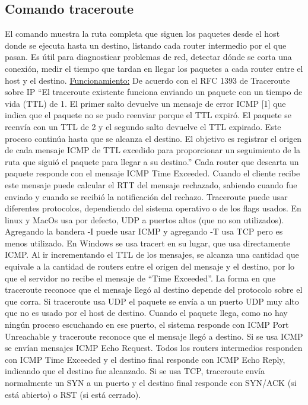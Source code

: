 \documentclass[12pt]{article} %
\begin{document}
\subsection{Comando traceroute} %
El comando muestra la ruta completa que siguen los paquetes desde el host donde se ejecuta hasta un destino, listando cada router intermedio por el que pasan. Es útil para diagnosticar problemas de red, detectar dónde se corta una conexión, medir el tiempo que tardan en llegar los paquetes a cada router entre el host y el destino.
\newline
\newline
\underline{Funcionamiento:}
De acuerdo con el RFC 1393 de Traceroute sobre IP “El traceroute existente funciona enviando un paquete con un tiempo de vida (TTL) de 1. El primer salto devuelve un mensaje de error ICMP [1] que indica que el paquete no se pudo reenviar porque el TTL expiró. El paquete se reenvía con un TTL de 2 y el segundo salto devuelve el TTL expirado. Este proceso continúa hasta que se alcanza el destino. El objetivo es registrar el origen de cada mensaje ICMP de TTL excedido para proporcionar un seguimiento de la ruta que siguió el paquete para llegar a su destino.”
\newline
\newline
Cada router que descarta un paquete responde con el mensaje ICMP Time Exceeded. Cuando el cliente recibe este mensaje puede calcular el RTT del mensaje rechazado, sabiendo cuando fue enviado y cuando se recibió la notificación del rechazo. 
\newline
\newline
Traceroute puede usar diferentes protocolos, dependiendo del sistema operativo o de los flags usados. En linux y MacOs usa por defecto, UDP a puertos altos (que no son utilizados). Agregando la bandera -I puede usar ICMP y agregando -T usa TCP pero es menos utilizado. En Windows se usa tracert en su lugar, que usa directamente ICMP.
\newline
\newline
Al ir incrementando el TTL de los mensajes, se alcanza una cantidad que equivale a la cantidad de routers entre el origen del mensaje y el destino, por lo que el servidor no recibe el mensaje de “Time Exceeded”. La forma en que traceroute reconoce que el mensaje llegó al destino depende del protocolo sobre el que corra. Si traceroute usa UDP el paquete se envía a un puerto UDP muy alto que no es usado por el host de destino. Cuando el paquete llega, como no hay ningún proceso escuchando en ese puerto, el sistema responde con ICMP Port Unreachable y traceroute reconoce que el mensaje llegó a destino. Si se usa ICMP se envían mensajes ICMP Echo Request. Todos los routers intermedios responden con ICMP Time Exceeded y el destino final responde con ICMP Echo Reply, indicando que el destino fue alcanzado. Si se usa TCP, traceroute envía normalmente un SYN a un puerto y el destino final responde con SYN/ACK (si está abierto) o RST (si está cerrado).
\end{document}
